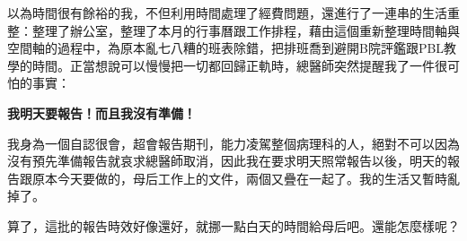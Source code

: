 \documentclass[
]{article}
\begin{document}
以為時間很有餘裕的我，不但利用時間處理了經費問題，還進行了一連串的生活重整：整理了辦公室，整理了本月的行事曆跟工作排程，藉由這個重新整理時間軸與空間軸的過程中，為原本亂七八糟的班表除錯，把排班喬到避開B院評鑑跟PBL教學的時間。正當想說可以慢慢把一切都回歸正軌時，總醫師突然提醒我了一件很可怕的事實：

\textbf{我明天要報告！而且我沒有準備！}

我身為一個自認很會，超會報告期刊，能力凌駕整個病理科的人，絕對不可以因為沒有預先準備報告就哀求總醫師取消，因此我在要求明天照常報告以後，明天的報告跟原本今天要做的，母后工作上的文件，兩個又疊在一起了。我的生活又暫時亂掉了。

算了，這批的報告時效好像還好，就挪一點白天的時間給母后吧。還能怎麼樣呢？
\end{document}
